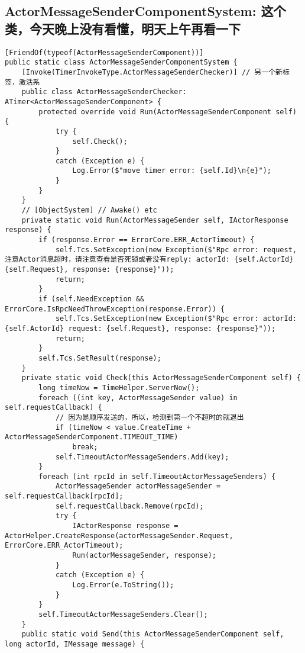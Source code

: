 \documentclass[9pt, b5paper]{article}
\begin{document}
\subsection{ActorMessageSenderComponentSystem: 这个类，今天晚上没有看懂，明天上午再看一下}
\label{sec-1-3}
\begin{verbatim}
[FriendOf(typeof(ActorMessageSenderComponent))]
public static class ActorMessageSenderComponentSystem {
    [Invoke(TimerInvokeType.ActorMessageSenderChecker)] // 另一个新标签，激活系
    public class ActorMessageSenderChecker: ATimer<ActorMessageSenderComponent> {
        protected override void Run(ActorMessageSenderComponent self) {
            try {
                self.Check();
            }
            catch (Exception e) {
                Log.Error($"move timer error: {self.Id}\n{e}");
            }
        }
    }
    // [ObjectSystem] // Awake() etc
    private static void Run(ActorMessageSender self, IActorResponse response) {
        if (response.Error == ErrorCore.ERR_ActorTimeout) {
            self.Tcs.SetException(new Exception($"Rpc error: request, 注意Actor消息超时，请注意查看是否死锁或者没有reply: actorId: {self.ActorId} {self.Request}, response: {response}"));
            return;
        }
        if (self.NeedException && ErrorCore.IsRpcNeedThrowException(response.Error)) {
            self.Tcs.SetException(new Exception($"Rpc error: actorId: {self.ActorId} request: {self.Request}, response: {response}"));
            return;
        }
        self.Tcs.SetResult(response);
    }
    private static void Check(this ActorMessageSenderComponent self) {
        long timeNow = TimeHelper.ServerNow();
        foreach ((int key, ActorMessageSender value) in self.requestCallback) {
            // 因为是顺序发送的，所以，检测到第一个不超时的就退出
            if (timeNow < value.CreateTime + ActorMessageSenderComponent.TIMEOUT_TIME) 
                break;
            self.TimeoutActorMessageSenders.Add(key);
        }
        foreach (int rpcId in self.TimeoutActorMessageSenders) {
            ActorMessageSender actorMessageSender = self.requestCallback[rpcId];
            self.requestCallback.Remove(rpcId);
            try {
                IActorResponse response = ActorHelper.CreateResponse(actorMessageSender.Request, ErrorCore.ERR_ActorTimeout);
                Run(actorMessageSender, response);
            }
            catch (Exception e) {
                Log.Error(e.ToString());
            }
        }
        self.TimeoutActorMessageSenders.Clear();
    }
    public static void Send(this ActorMessageSenderComponent self, long actorId, IMessage message) {

\end{verbatim}
\end{document}
